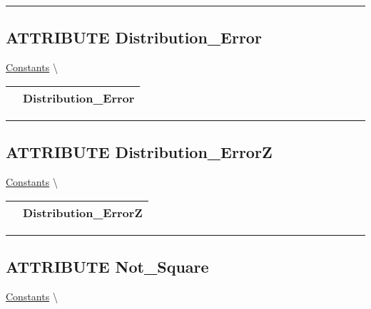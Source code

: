 \par


\rule{\linewidth}{0.5pt}
\subsection*{\textsf{\colorbox{headtoc}{\color{white} ATTRIBUTE}
Distribution\_Error}}

\hypertarget{ecldoc:pbblas.constants.distribution_error}{}
\hspace{0pt} \hyperlink{ecldoc:PBblas.Constants}{Constants} \textbackslash 

{\renewcommand{\arraystretch}{1.5}
\begin{tabularx}{\textwidth}{|>{\raggedright\arraybackslash}l|X|}
\hline
\hspace{0pt}\mytexttt{\color{red} } & \textbf{Distribution\_Error} \\
\hline
\end{tabularx}
}

\par


\rule{\linewidth}{0.5pt}
\subsection*{\textsf{\colorbox{headtoc}{\color{white} ATTRIBUTE}
Distribution\_ErrorZ}}

\hypertarget{ecldoc:pbblas.constants.distribution_errorz}{}
\hspace{0pt} \hyperlink{ecldoc:PBblas.Constants}{Constants} \textbackslash 

{\renewcommand{\arraystretch}{1.5}
\begin{tabularx}{\textwidth}{|>{\raggedright\arraybackslash}l|X|}
\hline
\hspace{0pt}\mytexttt{\color{red} } & \textbf{Distribution\_ErrorZ} \\
\hline
\end{tabularx}
}

\par


\rule{\linewidth}{0.5pt}
\subsection*{\textsf{\colorbox{headtoc}{\color{white} ATTRIBUTE}
Not\_Square}}

\hypertarget{ecldoc:pbblas.constants.not_square}{}
\hspace{0pt} \hyperlink{ecldoc:PBblas.Constants}{Constants} \textbackslash 

